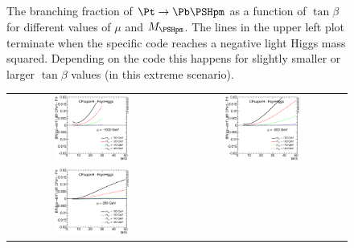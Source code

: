 \begin{figure}[ht]
\begin{tabular}{cc}
\end{tabular}
\caption{The branching fraction of $\Pt\rightarrow \Pb\PSHpm$ as a
  function of $\tan\beta$ for different values of $\mu$ and $\MHpm$. 
  The lines in the upper left plot terminate when the specific code
  reaches a negative light Higgs mass squared. Depending on the code this
  happens for slightly smaller or larger $\tan\beta$ values (in this
  extreme scenario).
}
\label{fig:BRTop2HPlus}
\end{figure}

\begin{figure}[ht]
  \centering
   \begin{tabular}{cc}
   \includegraphics[width=0.46\textwidth]{YRHXS_MSSM_charged/YRHXS_MSSM_charged_fig2a.eps} &
   \includegraphics[width=0.46\textwidth]{YRHXS_MSSM_charged/YRHXS_MSSM_charged_fig2b.eps} \\
   \includegraphics[width=0.46\textwidth]{YRHXS_MSSM_charged/YRHXS_MSSM_charged_fig2c.eps} &

\end{tabular}
\end{figure}
